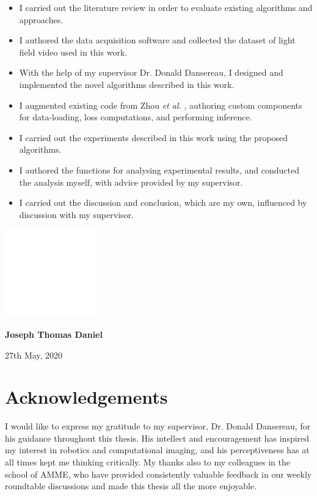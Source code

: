 \documentclass[openany]{book}
\begin{document}
\begin{itemize}
  \item I carried out the literature review in order to evaluate existing algorithms and approaches.
  \item I authored the data acquisition software and collected the dataset of light field video used in this work. 
  \item With the help of my supervisor Dr. Donald Dansereau, I designed and implemented the novel algorithms described in this work.
  \item I augmented existing code from Zhou \textit{et al.} \cite{zhou2017unsupervised}, authoring custom components for data-loading, loss computations, and performing inference.
  \item I carried out the experiments described in this work using the proposed algorithms.
  \item I authored the functions for analysing experimental results, and conducted the analysis myself, with advice provided by my supervisor. 
  \item I carried out the discussion and conclusion, which are my own, influenced by discussion with my supervisor.
\end{itemize}

\includegraphics[height=1.5in]{images/blank.png}

\textbf{Joseph Thomas Daniel} 

27th May, 2020


\chapter*{Acknowledgements}
I would like to express my gratitude to my supervisor, Dr. Donald Dansereau, for his guidance throughout this thesis. His intellect and encouragement has inspired my interest in robotics and computational imaging, and his perceptiveness has at all times kept me thinking critically. My thanks also to my colleagues in the school of AMME, who have provided consistently valuable feedback in our weekly roundtable discussions and made this thesis all the more enjoyable.
\end{document}
